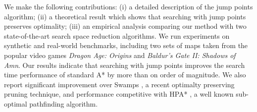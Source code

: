We make the following contributions: (i) a detailed description of the jump
points algorithm; (ii) a theoretical result which shows that searching with jump
points preserves optimality;  (iii) an empirical analysis comparing our method
with two state-of-the-art search space reduction algorithms.  We run experiments
on synthetic and real-world benchmarks, including two sets of maps taken from
the popular video games \emph{Dragon Age: Origins} and \emph{Baldur's Gate II:
Shadows of Amn}.  Our results indicate that searching with jump points improves
the search time performance of standard A* by more than on order of magnitude.
We also report significant improvement over Swamps \cite{pochter10}, a recent
optimalty preserving pruning technique, and performance competitive with HPA*
\cite{botea04}, a well known sub-optimal pathfinding algorithm.
